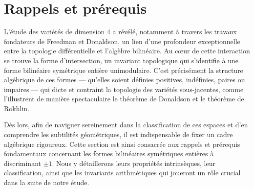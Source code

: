 \section{Rappels et prérequis}

L'étude des variétés de dimension $4$ a révélé, notamment à travers les travaux fondateurs de Freedman et Donaldson, un lien d'une profondeur exceptionnelle entre la topologie différentielle et l'algèbre bilinéaire. Au cœur de cette interaction se trouve la forme d'intersection, un invariant topologique qui s'identifie à une forme bilinéaire symétrique entière unimodulaire. C'est précisément la structure algébrique de ces formes — qu'elles soient définies positives, indéfinies, paires ou impaires — qui dicte et contraint la topologie des variétés sous-jacentes, comme l'illustrent de manière spectaculaire le théorème de Donaldson et le théorème de Rokhlin. 

Dès lors, afin de naviguer sereinement dans la classification de ces espaces et d'en comprendre les subtilités géométriques, il est indispensable de fixer un cadre algébrique rigoureux. Cette section est ainsi consacrée aux rappels et prérequis fondamentaux concernant les formes bilinéaires symétriques entières à discriminant $\pm 1$. Nous y détaillerons leurs propriétés intrinsèques, leur classification, ainsi que les invariants arithmétiques qui joueront un rôle crucial dans la suite de notre étude.



